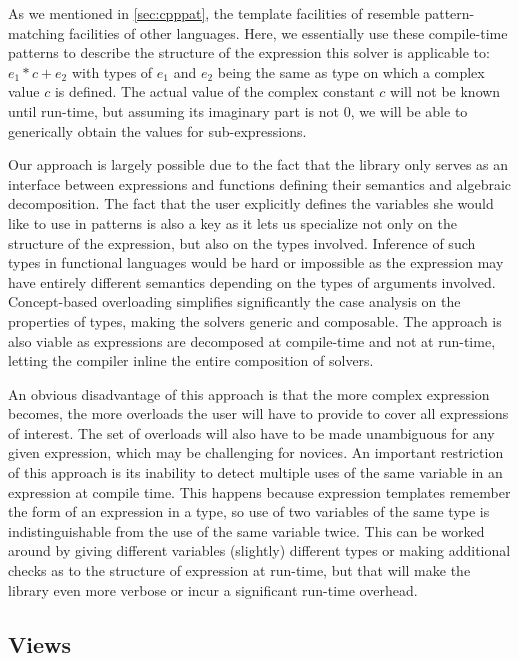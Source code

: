 \noindent
As we mentioned in \textsection\ref{sec:cpppat}, the template facilities of 
\Cpp{} resemble pattern-matching facilities of other languages. Here, we 
essentially use these compile-time patterns to describe the structure of the 
expression this solver is applicable to: $e_1*c+e_2$ with types of $e_1$ and 
$e_2$ being the same as type on which a complex value $c$ is defined. The actual 
value of the complex constant $c$ will not be known until run-time, but assuming 
its imaginary part is not $0$, we will be able to generically obtain the values 
for sub-expressions.

Our approach is largely possible due to the fact that the library only serves as 
an interface between expressions and functions defining their semantics and 
algebraic decomposition. The fact that the user explicitly defines the variables 
she would like to use in patterns is also a key as it lets us specialize not 
only on the structure of the expression, but also on the types involved. 
Inference of such types in functional languages would be hard or impossible as the 
expression may have entirely different semantics depending on the types of 
arguments involved. Concept-based overloading simplifies significantly the case 
analysis on the properties of types, making the solvers generic and composable.
The approach is also viable as expressions are decomposed at compile-time and 
not at run-time, letting the compiler inline the entire composition of solvers. 

An obvious disadvantage of this approach is that the more complex expression 
becomes, the more overloads the user will have to provide to cover all 
expressions of interest. The set of overloads will also have to be made 
unambiguous for any given expression, which may be challenging for novices. An 
important restriction of this approach is its inability to detect multiple uses 
of the same variable in an expression at compile time. This happens because 
expression templates remember the form of an expression in a type, so use of two 
variables of the same type is indistinguishable from the use of the same 
variable twice. This can be worked around by giving different variables 
(slightly) different types or making additional checks as to the structure of 
expression at run-time, but that will make the library even more verbose or 
incur a significant run-time overhead.

\subsection{Views}
\label{sec:view}

